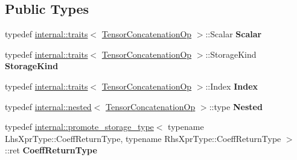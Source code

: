 \subsection*{Public Types}
\begin{DoxyCompactItemize}
\item 
\mbox{\label{class_eigen_1_1_tensor_concatenation_op_ab6168dbb30bf57f40cfe9953fa255fee}} 
typedef \hyperlink{struct_eigen_1_1internal_1_1traits}{internal\+::traits}$<$ \hyperlink{class_eigen_1_1_tensor_concatenation_op}{Tensor\+Concatenation\+Op} $>$\+::Scalar {\bfseries Scalar}
\item 
\mbox{\label{class_eigen_1_1_tensor_concatenation_op_a0b5672d304832d232cb421ece668290f}} 
typedef \hyperlink{struct_eigen_1_1internal_1_1traits}{internal\+::traits}$<$ \hyperlink{class_eigen_1_1_tensor_concatenation_op}{Tensor\+Concatenation\+Op} $>$\+::Storage\+Kind {\bfseries Storage\+Kind}
\item 
\mbox{\label{class_eigen_1_1_tensor_concatenation_op_a72164848fbcaab6670bd33aa605418ac}} 
typedef \hyperlink{struct_eigen_1_1internal_1_1traits}{internal\+::traits}$<$ \hyperlink{class_eigen_1_1_tensor_concatenation_op}{Tensor\+Concatenation\+Op} $>$\+::Index {\bfseries Index}
\item 
\mbox{\label{class_eigen_1_1_tensor_concatenation_op_a4d5fc215747e4838c724be67dbd18993}} 
typedef \hyperlink{struct_eigen_1_1internal_1_1nested}{internal\+::nested}$<$ \hyperlink{class_eigen_1_1_tensor_concatenation_op}{Tensor\+Concatenation\+Op} $>$\+::type {\bfseries Nested}
\item 
\mbox{\label{class_eigen_1_1_tensor_concatenation_op_ab8588a7cd2279fbdcdf3780b4529ff35}} 
typedef \hyperlink{struct_eigen_1_1internal_1_1promote__storage__type}{internal\+::promote\+\_\+storage\+\_\+type}$<$ typename Lhs\+Xpr\+Type\+::\+Coeff\+Return\+Type, typename Rhs\+Xpr\+Type\+::\+Coeff\+Return\+Type $>$\+::ret {\bfseries Coeff\+Return\+Type}
\item 
\mbox{\label{class_eigen_1_1_tensor_concatenation_op_a884f426dfd66a809b7ffec0781935648}} 

\end{DoxyCompactItemize}
